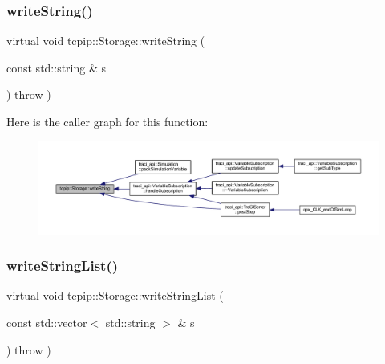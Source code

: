 \subsubsection{\texorpdfstring{write\+String()}{writeString()}}
{\footnotesize\ttfamily virtual void tcpip\+::\+Storage\+::write\+String (\begin{DoxyParamCaption}\item[{const std\+::string \&}]{s }\end{DoxyParamCaption}) throw  ) \hspace{0.3cm}{\ttfamily [virtual]}}

Here is the caller graph for this function\+:\nopagebreak
\begin{figure}[H]
\begin{center}
\leavevmode
\includegraphics[width=350pt]{classtcpip_1_1_storage_a07b6d4f8db8f1893aa4ed419be5a5d25_icgraph}
\end{center}
\end{figure}
\mbox{\label{classtcpip_1_1_storage_ac1d5d12f930b3884f3265508f2b43901}} 
\subsubsection{\texorpdfstring{write\+String\+List()}{writeStringList()}}
{\footnotesize\ttfamily virtual void tcpip\+::\+Storage\+::write\+String\+List (\begin{DoxyParamCaption}\item[{const std\+::vector$<$ std\+::string $>$ \&}]{s }\end{DoxyParamCaption}) throw  ) \hspace{0.3cm}{\ttfamily [virtual]}}

